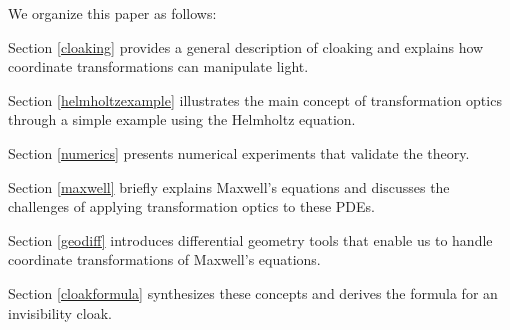 We organize this paper as follows:

Section \ref{cloaking} provides a
general description of cloaking and explains how coordinate transformations can
manipulate light.

Section \ref{helmholtzexample} illustrates the main concept of
transformation optics through a simple example using the Helmholtz equation.

Section \ref{numerics} presents numerical experiments that validate the
theory.

Section \ref{maxwell} briefly explains Maxwell's equations and discusses the
challenges of applying transformation optics to these PDEs.

Section \ref{geodiff} introduces differential geometry tools that enable us to
handle coordinate transformations of Maxwell's equations.

Section \ref{cloakformula} synthesizes these concepts and derives
the formula for an invisibility cloak.
